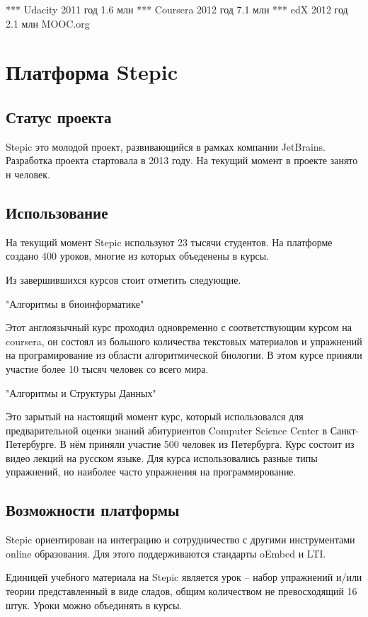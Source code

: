 \documentclass{matmex-diploma-custom}
\begin{document}
*** Udacity
   2011 год
   1.6 млн
*** Coursera
   2012 год
   7.1 млн
*** edX
   2012 год
   2.1 млн
   MOOC.org

\section{Платформа Stepic}

\subsection{Статус проекта}
Stepic это молодой проект, развивающийся в рамках компании
JetBrains. Разработка проекта стартовала в 2013 году. На текущий
момент в проекте занято н человек.

\subsection{Использование}
На текущий момент Stepic используют 23 тысячи студентов. На платформе
создано 400 уроков, многие из которых объеденены в курсы.

Из завершившихся курсов стоит отметить следующие.

"Алгоритмы в биоинформатике"

Этот англоязычный курс проходил одновременно с соответствующим курсом
на coursera, он состоял из большого количества текстовых материалов и
упражнений на програмирование из области алгоритмической биологии. В
этом курсе приняли участие более 10 тысяч человек со всего мира.

"Алгоритмы и Структуры Данных"

Это зарытый на настоящий момент курс, который использовался для
предварительной оценки знаний абитуриентов Computer Science Center в
Санкт-Петербурге. В нём приняли участие 500 человек из
Петербурга. Курс состоит из видео лекций на русском языке. Для курса
использовались разные типы упражнений, но наиболее часто упражнения на
программирование.

\subsection{Возможности платформы}
Stepic ориентирован на интеграцию и сотрудничество с другими инструментами
online образования. Для этого поддерживаются стандарты oEmbed и LTI.

Единицей учебного материала на Stepic является урок -- набор упражнений
и/или теории представленный в виде сладов, общим количеством не
превосходящий 16 штук. Уроки можно объединять в курсы.
\end{document}
